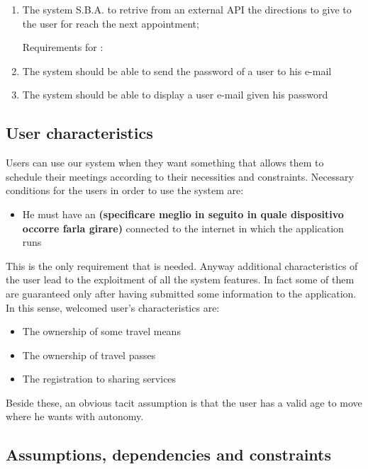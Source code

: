 \begin{enumerate}
\item The system S.B.A. to retrive from an external API the directions to give to the user for reach the next appointment;

Requirements for :

\item The system should be able to send the password of a user to his e-mail

\item The system should be able to display a user e-mail given his password 


\end{enumerate}


\subsection{User characteristics}
Users can use our system when they want something that allows them to schedule their meetings according to their necessities and constraints. Necessary conditions for the users in order to use the system are: 

\begin{itemize}
\item He must have an \textbf{(specificare meglio in seguito in quale dispositivo occorre farla girare)} connected to the internet in which the application runs
\end{itemize}

This is the only requirement that is needed. Anyway additional characteristics of the user lead to the exploitment of all the system features. In fact some of them are guaranteed only after having submitted some information to the application.
In this sense, welcomed user's characteristics are:

\begin{itemize}
\item The ownership of some travel means
\item The ownership of travel passes
\item The registration to sharing services
\end{itemize}

Beside these, an obvious tacit assumption is that the user has a valid age to move where he wants with autonomy.


\subsection{ Assumptions, dependencies and constraints}

